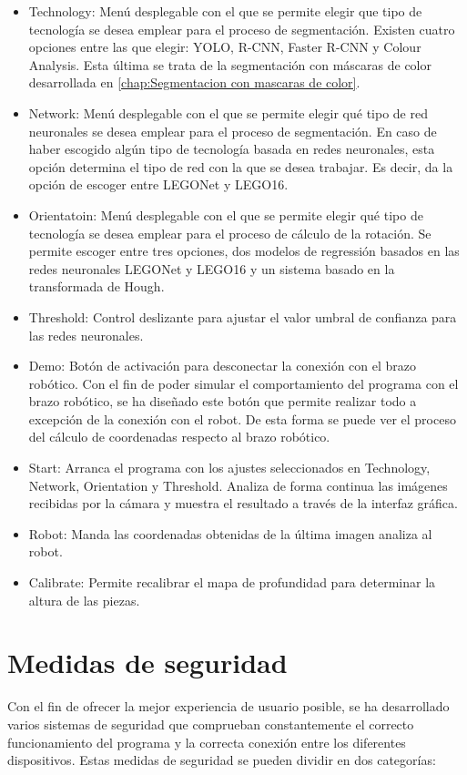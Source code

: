 \begin{itemize}
\item Technology: Menú desplegable con el que se permite elegir que tipo de tecnología se desea emplear para el proceso de segmentación. Existen cuatro opciones entre las que elegir: YOLO, R-CNN, Faster R-CNN y Colour Analysis. Esta última se trata de la segmentación con máscaras de color desarrollada en \autoref{chap:Segmentacion con mascaras de color}.
\item Network: Menú desplegable con el que se permite elegir qué tipo de red neuronales se desea emplear para el proceso de segmentación. En caso de haber escogido algún tipo de tecnología basada en redes neuronales, esta opción determina el tipo de red con la que se desea trabajar. Es decir, da la opción de escoger entre LEGONet y LEGO16.
\item Orientatoin: Menú desplegable con el que se permite elegir qué tipo de tecnología se desea emplear para el proceso de cálculo de la rotación. Se permite escoger entre tres opciones, dos modelos de regressión basados en las redes neuronales LEGONet y LEGO16 y un sistema basado en la transformada de Hough.
\item Threshold: Control deslizante para ajustar el valor umbral de confianza para las redes neuronales.
\item Demo: Botón de activación para desconectar la conexión con el brazo robótico. Con el fin de poder simular el comportamiento del programa con el brazo robótico, se ha diseñado este botón que permite realizar todo a excepción de la conexión con el robot. De esta forma se puede ver el proceso del cálculo de coordenadas respecto al brazo robótico.
\item Start: Arranca el programa con los ajustes seleccionados en Technology, Network, Orientation y Threshold. Analiza de forma continua las imágenes recibidas por la cámara y muestra el resultado a través de la interfaz gráfica.
\item Robot: Manda las coordenadas obtenidas de la última imagen analiza al robot.
\item Calibrate: Permite recalibrar el mapa de profundidad para determinar la altura de las piezas.
\end{itemize}

\section{Medidas de seguridad}
Con el fin de ofrecer la mejor experiencia de usuario posible, se ha desarrollado varios sistemas de seguridad que comprueban constantemente el correcto funcionamiento del programa y la correcta conexión entre los diferentes dispositivos. Estas medidas de seguridad se pueden dividir en dos categorías:

